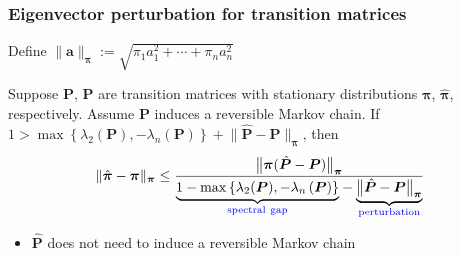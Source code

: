 \documentclass[compress,
mathserif,wide,%
]{beamer}
\begin{document}
\begin{frame}
	\frametitle{Eigenvector perturbation for transition matrices}


\hfill Define $\| \bm{a} \|_{\bm{\pi}}:= \sqrt{ \pi_1 a_1^2 + \cdots + \pi_n a_n^2 }$

\medskip

\begin{theorem}
\label{thm:mc-perturbation}
Suppose $\bm{P}$, $\hat{\bm{P}}$ are 
transition matrices with stationary distributions $\bm{\pi}$, $\hat{\bm{\pi}}$, respectively. Assume $\bm{P}$ induces a
reversible Markov chain. If $1 > \max\left\{ \lambda_{2}(\bm{P}),-\lambda_{n}\left(\bm{P}\right)\right\} + \big\| \hat{\bm{P}} - \bm{P} \big\|_{\bm{\pi}}$, then
%
\[
\| \hat{\bm{\pi}} - \bm{\pi}\|_{\bm{\pi}}\leq\frac{\big\|\bm{\pi} ( \hat{\bm{P}} - \bm{P} )\big\|_{\bm{\pi}}}{ \underset{\textcolor{blue}{ \mathrm{spectral~gap}}}{\underbrace{1-\max\left\{ \lambda_{2}(\bm{P}),-\lambda_{n}\left(\bm{P}\right)\right\} }} -  \underset{\textcolor{blue}{ \mathrm{perturbation}}}{\underbrace{ \big\| \hat{\bm{P}} - \bm{P} \big\|_{\bm{\pi}}}}} 
\]
%
\end{theorem}

\medskip
\begin{itemize}
	\item $\hat{\bm{P}}$ does not need to induce a reversible Markov chain
\end{itemize}

\end{frame}
\end{document}
